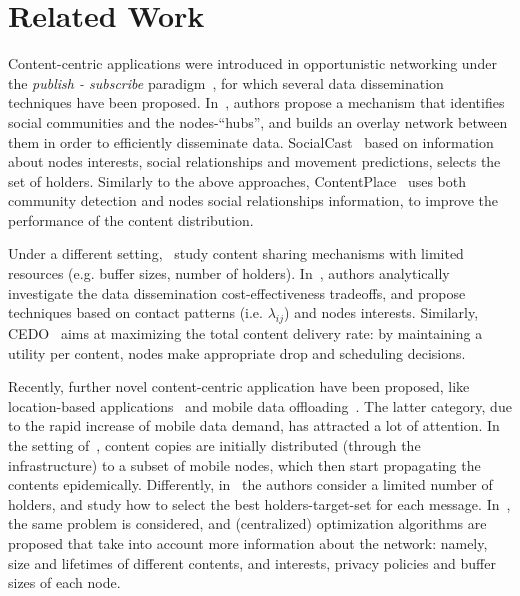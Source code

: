 \documentclass[journal]{IEEEtran}
\begin{document}
\section{Related Work}\label{sec:related-work}
Content-centric applications were introduced in opportunistic networking under the \textit{publish - subscribe} paradigm~\cite{Yoneki-publish-subscribe-dtn,podcasting,Costa-publish-subscribe-dtn,contentplace}, for which several data dissemination techniques have been proposed. In~\cite{Yoneki-publish-subscribe-dtn}, authors propose a mechanism that identifies social communities and the nodes-``hubs'', and builds an overlay network between them in order to efficiently disseminate data. SocialCast~\cite{Costa-publish-subscribe-dtn} based on information about nodes interests, social relationships and movement predictions, selects the set of holders. Similarly to the above approaches, ContentPlace~\cite{contentplace} uses both community detection and nodes social relationships information, to improve the performance of the content distribution. 

Under a different setting,~\cite{Gao-user-centric-DTN,CEDO} study content sharing mechanisms with limited resources (e.g. buffer sizes, number of holders). In~\cite{Gao-user-centric-DTN}, authors analytically investigate the data dissemination cost-effectiveness tradeoffs, and propose techniques based on contact patterns (i.e. $\lambda_{ij}$) and nodes interests. Similarly, CEDO~\cite{CEDO} aims at maximizing the total content delivery rate: by maintaining a utility per content, nodes make appropriate drop and scheduling decisions. 


Recently, further novel content-centric application have been proposed, like location-based applications~\cite{MobComp-next-decade,Ott-oppnet-applications} and mobile data offloading~\cite{offloading-wowmom11,Hui-Offloading, multiple-offloading}. The latter category, due to the rapid increase of mobile data demand, has attracted a lot of attention. In the setting of~\cite{offloading-wowmom11}, content copies are initially distributed (through the infrastructure) to a subset of mobile nodes, which then start propagating the contents epidemically. Differently, in~\cite{Hui-Offloading} the authors consider a limited number of holders, and study how to select the best holders-target-set for each message. In~\cite{multiple-offloading}, the same problem is considered, and (centralized) optimization algorithms are proposed that take into account more information about the network: namely, size and lifetimes of different contents, and interests, privacy policies and buffer sizes of each node. 
\end{document}
